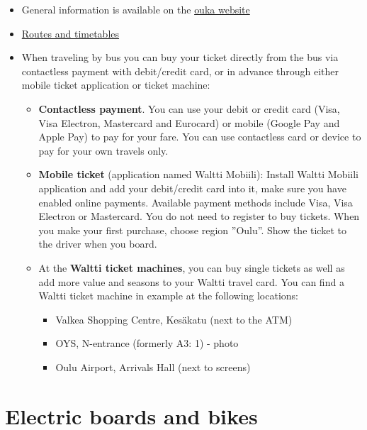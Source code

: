 \documentclass[
  oneside]{book}
\providecommand{\tightlist}{%
  \setlength{\itemsep}{0pt}\setlength{\parskip}{0pt}}
\begin{document}
\begin{itemize}
\tightlist
\item
  General information is available on the \href{https://www.ouka.fi/oulu/public-transport/}{ouka website}
\item
  \href{https://www.ouka.fi/oulu/public-transport/routes-and-timetables/}{Routes and timetables}
\item
  When traveling by bus you can buy your ticket directly from the bus via contactless payment with
  debit/credit card, or in advance through either mobile ticket application or ticket machine:

  \begin{itemize}
  \tightlist
  \item
    \textbf{Contactless payment}. You can use your debit or credit card (Visa, Visa Electron, Mastercard and Eurocard) or mobile (Google Pay and Apple Pay) to pay for your fare. You can use contactless card or device to pay for your own travels only.
  \item
    \textbf{Mobile ticket} (application named Waltti Mobiili): Install Waltti Mobiili application and add your debit/credit card into it, make sure you have enabled online payments. Available payment methods include Visa, Visa Electron or Mastercard. You do not need to register to buy tickets. When you make your first purchase, choose region ''Oulu''. Show the ticket to the driver when you board.
  \item
    At the \textbf{Waltti ticket machines}, you can buy single tickets as well as add more value and seasons to your Waltti travel card. You can find a Waltti ticket machine in example at the following locations:

    \begin{itemize}
    \tightlist
    \item
      Valkea Shopping Centre, Kesäkatu (next to the ATM)
    \item
      OYS, N-entrance (formerly A3: 1) - photo
    \item
      Oulu Airport, Arrivals Hall (next to screens)
    \end{itemize}
  \end{itemize}
\end{itemize}

\hypertarget{electric-boards-and-bikes}{%
\section{Electric boards and bikes}\label{electric-boards-and-bikes}}
\end{document}
